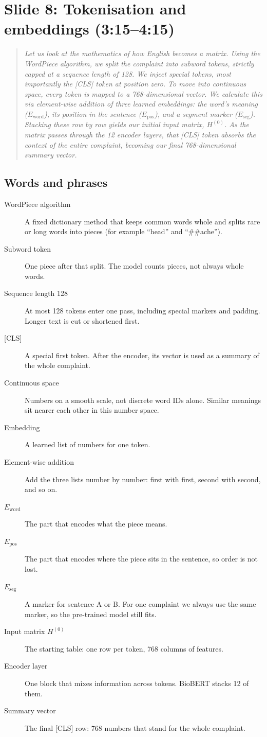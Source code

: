 \documentclass[11pt,a4paper]{article}
\newcommand{\say}[1]{\begin{quote}\itshape #1\end{quote}}
\newcommand{\terms}{\subsection*{Words and phrases}}
\begin{document}
\section{Slide 8: Tokenisation and embeddings (3:15--4:15)}

\say{Let us look at the mathematics of how English becomes a matrix. Using the WordPiece algorithm, we split the complaint into subword tokens, strictly capped at a sequence length of 128. We inject special tokens, most importantly the [CLS] token at position zero. To move into continuous space, every token is mapped to a 768-dimensional vector. We calculate this via element-wise addition of three learned embeddings: the word's meaning (\(E_{\mathrm{word}}\)), its position in the sentence (\(E_{\mathrm{pos}}\)), and a segment marker (\(E_{\mathrm{seg}}\)). Stacking these row by row yields our initial input matrix, \(H^{(0)}\). As the matrix passes through the 12 encoder layers, that [CLS] token absorbs the context of the entire complaint, becoming our final 768-dimensional summary vector.}

\terms
\begin{description}
\item[WordPiece algorithm] A fixed dictionary method that keeps common words whole and splits rare or long words into pieces (for example ``head'' and ``\#\#ache'').
\item[Subword token] One piece after that split. The model counts pieces, not always whole words.
\item[Sequence length 128] At most 128 tokens enter one pass, including special markers and padding. Longer text is cut or shortened first.
\item[{[CLS]}] A special first token. After the encoder, its vector is used as a summary of the whole complaint.
\item[Continuous space] Numbers on a smooth scale, not discrete word IDs alone. Similar meanings sit nearer each other in this number space.
\item[Embedding] A learned list of numbers for one token.
\item[Element-wise addition] Add the three lists number by number: first with first, second with second, and so on.
\item[\(E_{\mathrm{word}}\)] The part that encodes what the piece means.
\item[\(E_{\mathrm{pos}}\)] The part that encodes where the piece sits in the sentence, so order is not lost.
\item[\(E_{\mathrm{seg}}\)] A marker for sentence A or B. For one complaint we always use the same marker, so the pre-trained model still fits.
\item[Input matrix \(H^{(0)}\)] The starting table: one row per token, 768 columns of features.
\item[Encoder layer] One block that mixes information across tokens. BioBERT stacks 12 of them.
\item[Summary vector] The final [CLS] row: 768 numbers that stand for the whole complaint.
\end{description}
\end{document}
